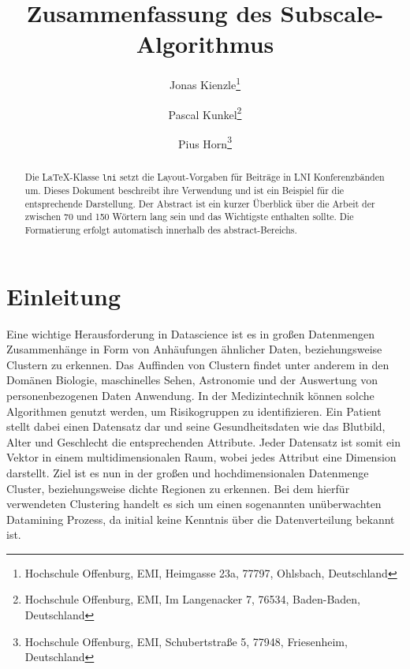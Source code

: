 \documentclass[utf8,biblatex]{lni}
\begin{document}
\title[Subscale]{Zusammenfassung des Subscale-Algorithmus}
\author[Jonas Kienzle, Pascal Kunkel \and Pius Horn]
{Jonas Kienzle\footnote{Hochschule Offenburg, EMI, Heimgasse 23a, 77797, Ohlsbach, Deutschland } \and
 Pascal Kunkel\footnote{Hochschule Offenburg, EMI, Im Langenacker 7, 76534, Baden-Baden, Deutschland } \and
Pius Horn\footnote{Hochschule Offenburg, EMI, Schubertstraße 5, 77948, Friesenheim, Deutschland }}
\maketitle

\begin{abstract}
Die \LaTeX-Klasse \texttt{lni} setzt die Layout-Vorgaben für Beiträge in LNI Konferenzbänden um.
Dieses Dokument beschreibt ihre Verwendung und ist ein Beispiel für die entsprechende Darstellung.
Der Abstract ist ein kurzer Überblick über die Arbeit der zwischen 70 und 150 Wörtern lang sein und das Wichtigste enthalten sollte.
Die Formatierung erfolgt automatisch innerhalb des abstract-Bereichs.
\end{abstract}


\section{Einleitung}
Eine wichtige Herausforderung in Datascience ist es in großen
Datenmengen Zusammenhänge in Form von Anhäufungen ähnlicher Daten,
beziehungsweise Clustern zu erkennen.
Das Auffinden von Clustern findet unter anderem in den
Domänen Biologie, maschinelles Sehen, Astronomie und der Auswertung
von personenbezogenen Daten Anwendung.
In der Medizintechnik können solche Algorithmen genutzt werden,
um Risikogruppen zu identifizieren.
Ein Patient stellt dabei einen Datensatz dar und seine
Gesundheitsdaten wie das Blutbild, Alter und Geschlecht
die entsprechenden Attribute.
Jeder Datensatz ist somit ein Vektor in einem multidimensionalen Raum,
wobei jedes Attribut eine Dimension darstellt.
Ziel ist es nun in der großen und hochdimensionalen Datenmenge
Cluster, beziehungsweise dichte Regionen zu erkennen.
Bei dem hierfür verwendeten Clustering handelt es sich um einen sogenannten
unüberwachten Datamining Prozess, da initial keine Kenntnis über die
Datenverteilung bekannt ist.
\end{document}
